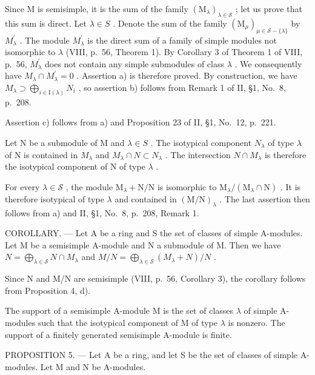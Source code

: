 Since M is semisimple, it is the sum of the family \((\mathrm{M}_{\lambda})_{\lambda\in\mathcal{S}}\) ; let us prove that this sum is direct. Let \(\lambda\in S\) . Denote the sum of the family \((\mathrm{M}_{\mu})_{\mu\in\mathcal{S}-\{\lambda\}}\) by \(M_{\lambda}^{\prime}\) . The module \(M_{\lambda}^{\prime}\) is the direct sum of a family of simple modules not isomorphic to \(\lambda\) (VIII, p.~56, Theorem 1). By Corollary 3 of Theorem 1 of VIII, p.~56, \(M_{\lambda}^{\prime}\) does not contain any simple submodules of class \(\lambda\) . We consequently have \(M_{\lambda}\cap M_{\lambda}^{\prime}=0\) . Assertion a) is therefore proved. By construction, we have \(M_{\lambda}\supset\bigoplus_{i\in\mathrm{I}(\lambda)}N_{i}\) , so assertion b) follows from Remark 1 of II, §1, No.~8, p.~208.

Assertion c) follows from a) and Proposition 23 of II, §1, No.~12, p.~221.

Let N be a submodule of M and \(\lambda\in S\) . The isotypical component \(N_{\lambda}\) of type \(\lambda\) of N is contained in \(M_{\lambda}\) and \(M_{\lambda}\cap N\subset N_{\lambda}\) . The intersection \(N\cap M_{\lambda}\) is therefore the isotypical component of N of type \(\lambda\) .

For every \(\lambda \in \mathcal{S}\) , the module \(\mathrm{M}_{\lambda} + \mathrm{N} / \mathrm{N}\) is isomorphic to \(\mathrm{M}_{\lambda} / (\mathrm{M}_{\lambda} \cap \mathrm{N})\) . It is therefore isotypical of type \(\lambda\) and contained in \((\mathrm{M} / \mathrm{N})_{\lambda}\) . The last assertion then follows from a) and II, §1, No.~8, p.~208, Remark 1.

COROLLARY. --- Let A be a ring and S the set of classes of simple A-modules. Let M be a semisimple A-module and N a submodule of M. Then we have \(N = \bigoplus_{\lambda \in \mathscr{S}} N \cap M_{\lambda}\) and \(M/N = \bigoplus_{\lambda \in \mathscr{S}} (M_{\lambda} + N)/N\) .

Since N and M/N are semisimple (VIII, p.~56, Corollary 3), the corollary follows from Proposition 4, d).

The support of a semisimple A-module M is the set of classes \(\lambda\) of simple A-modules such that the isotypical component of M of type \(\lambda\) is nonzero. The support of a finitely generated semisimple A-module is finite.

PROPOSITION 5. --- Let A be a ring, and let S be the set of classes of simple A-modules. Let M and N be A-modules.

